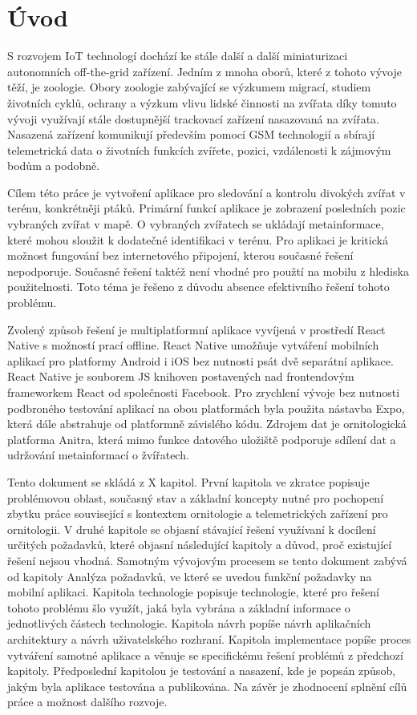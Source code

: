 \chapter*{Úvod}

S rozvojem IoT technologí dochází ke stále další a další miniaturizaci autonomních off-the-grid zařízení. Jedním z mnoha oborů, které z tohoto vývoje těží, je zoologie. Obory zoologie zabývající se výzkumem migrací, studiem životních cyklů, ochrany a výzkum vlivu lidské činnosti na zvířata díky tomuto vývoji využívají stále dostupnější trackovací zařízení nasazovaná na zvířata. Nasazená zařízení komunikují především pomocí GSM technologií a sbírají telemetrická data o životních funkcích zvířete, pozici, vzdálenosti k zájmovým bodům a podobně.


Cílem této práce je vytvoření aplikace pro sledování a kontrolu divokých zvířat v terénu, konkrétněji ptáků. Primární funkcí aplikace je zobrazení posledních pozic vybraných zvířat v mapě. O vybraných zvířatech se ukládají metainformace, které mohou sloužit k dodatečné identifikaci v terénu. Pro aplikaci je kritická možnost fungování bez internetového připojení, kterou současné řešení nepodporuje. Současné řešení taktéž není vhodné pro použtí na mobilu z hlediska použitelnosti. Toto téma je řešeno z důvodu absence efektivního řešení tohoto problému.

Zvolený způsob řešení je multiplatformní aplikace vyvíjená v prostředí React Native s možností prací offline. React Native umožňuje vytváření mobilních aplikací pro platformy Android i iOS bez nutnosti psát dvě separátní aplikace. React Native je souborem JS knihoven postavených nad frontendovým frameworkem React od společnosti Facebook. Pro zrychlení vývoje bez nutnosti podbroného testování aplikací na obou platformách byla použita nástavba Expo, která dále abstrahuje od platformně závislého kódu. Zdrojem dat je ornitologická platforma Anitra, která mimo funkce datového uložiště podporuje sdílení dat a udržování metainformací o žvířatech.

Tento dokument se skládá z X kapitol. První kapitola ve zkratce popisuje problémovou oblast, současný stav a základní koncepty nutné pro pochopení zbytku práce související s kontextem ornitologie a telemetrických zařízení pro ornitologii. V druhé kapitole se objasní stávající řešení využívaní k docílení určitých požadavků, které objasní následující kapitoly a důvod, proč existující řešení nejsou vhodná. Samotným vývojovým procesem se tento dokument zabývá od kapitoly Analýza požadavků, ve které se uvedou funkční požadavky na mobilní aplikaci. Kapitola technologie popisuje technologie, které pro řešení tohoto problému šlo využít, jaká byla vybrána a základní informace o jednotlivých částech technologie. Kapitola návrh popíše návrh aplikačních architektury a návrh uživatelského rozhraní. Kapitola implementace popíše proces vytváření samotné aplikace a věnuje se specifickému řešení problémů z předchozí kapitoly. Předposlední kapitolou je testování a nasazení, kde je popsán způsob, jakým byla aplikace testována a publikována. Na závěr je zhodnocení splnění cílů práce a možnost dalšího rozvoje.

